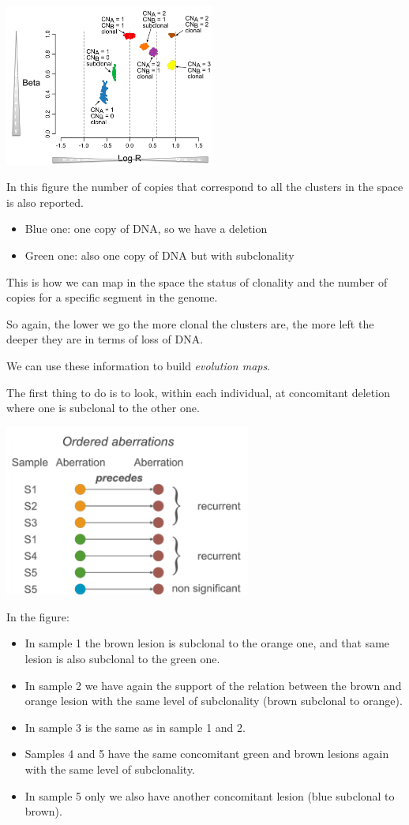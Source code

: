 \includegraphics[width=2.72153in,height=2.08958in]{image3.png}

In this figure the number of copies that correspond to all the clusters in the
space is also reported.

\begin{itemize}
\item
  Blue one: one copy of DNA, so we have a deletion
\item
  Green one: also one copy of DNA but with subclonality
\end{itemize}

This is how we can map in the space the status of clonality and the number of
copies for a specific segment in the genome.

So again, the lower we go the more clonal the clusters are, the more left the
deeper they are in terms of loss of DNA.

We can use these information to build \emph{{evolution maps}}.

The first thing to do is to look, within each individual, at concomitant
deletion where one is subclonal to the other one.

\includegraphics[width=3.18859in,height=2.21348in]{image4.png}

In the figure:

\begin{itemize}
\item
  In sample 1 the brown lesion is subclonal to the orange one, and that same
  lesion is also subclonal to the green one.
\item
  In sample 2 we have again the support of the relation between the brown and
  orange lesion with the same level of subclonality (brown subclonal to orange).
\item
  In sample 3 is the same as in sample 1 and 2.
\item
  Samples 4 and 5 have the same concomitant green and brown lesions again with
  the same level of subclonality.
\item
  In sample 5 only we also have another concomitant lesion (blue subclonal to
  brown).
\end{itemize}

